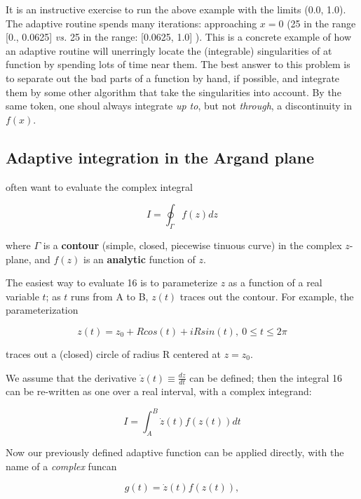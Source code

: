 It is an instructive exercise to run the above example with the limits (0.0, 1.0). The adaptive routine spends many iterations: approaching $x = 0$ (25 in the range [0., 0.0625] \textit{vs.} 25 in the range: [0.0625, 1.0] ). This is a concrete example of how an adaptive routine will unerringly locate the (integrable) singularities of at function by spending lots of time near them. The best answer to this problem is to separate out the bad parts of a function by hand, if possible, and integrate them by some other algorithm that take the singularities into account. By the same token, one shoul always integrate \textit{up to}, but not \textit{through}, a discontinuity in $f(x)$.

\subsection{Adaptive integration in the Argand plane}
 often want to evaluate the complex integral

\begin{equation}
I = \oint_{\Gamma}f(z)dz
\end{equation}

where $\Gamma$ is a \textbf{contour} (simple, closed, piecewise tinuous curve) in the complex $z$-plane, and $f(z)$ is an \textbf{analytic} function of $z$.

The easiest way to evaluate 16 is to parameterize $z$ as a function of a real variable $t$; as $t$ runs from A to B, $z(t)$ traces out the contour. For example, the parameterization

\begin{equation}
z(t) = z_0 + R cos(t) + iR sin(t) ,\ 0 \leq t \leq 2\pi
\end{equation}

traces out a (closed) circle of radius R centered at $z = z_0$.

We assume that the derivative $\dot{z}(t)\equiv \frac{dz}{dt}$ can be defined; then the integral 16 can be re-written as one over a real interval, with a complex integrand:

\begin{equation}
I = \int_{A}^{B} \dot{z}(t)f\left( z(t) \right) dt
\end{equation}

Now our previously defined adaptive function  can be applied directly, with  the name of a \textit{complex} funcan

\begin{equation}
g(t) = \dot{z}(t)f\left( z(t) \right),
\end{equation}

